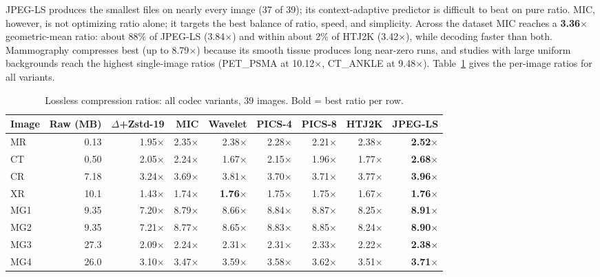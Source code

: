 \documentclass[journal]{IEEEtran}
\begin{document}
JPEG-LS produces the smallest files on nearly every image (37 of 39); its
context-adaptive predictor is difficult to beat on pure ratio. MIC, however, is
not optimizing ratio alone; it targets the best balance of ratio, speed, and
simplicity. Across the dataset MIC reaches a \textbf{3.36}$\times$
geometric-mean ratio: about 88\% of JPEG-LS (3.84$\times$) and within about 2\%
of HTJ2K (3.42$\times$), while decoding faster than both. Mammography compresses
best (up to 8.79$\times$) because its smooth tissue produces long near-zero
runs, and studies with large uniform backgrounds reach the highest single-image
ratios (PET\_PSMA at 10.12$\times$, CT\_ANKLE at 9.48$\times$).
Table~\ref{tab:ratios} gives the per-image ratios for all variants.

\begin{table}[t]
\centering
\caption{Lossless compression ratios: all codec variants, 39 images. Bold =
best ratio per row.}
\label{tab:ratios}
\scriptsize
\begin{tabular}{lrrrrrrrr}
\toprule
Image & Raw (MB) & $\Delta$+Zstd-19 & MIC & Wavelet & PICS-4 & PICS-8 & HTJ2K & JPEG-LS \\
\midrule
MR             & 0.13 & 1.95$\times$ & 2.35$\times$ & 2.38$\times$ & 2.28$\times$ & 2.21$\times$ & 2.38$\times$ & \textbf{2.52$\times$} \\
CT             & 0.50 & 2.05$\times$ & 2.24$\times$ & 1.67$\times$ & 2.15$\times$ & 1.96$\times$ & 1.77$\times$ & \textbf{2.68$\times$} \\
CR             & 7.18 & 3.24$\times$ & 3.69$\times$ & 3.81$\times$ & 3.70$\times$ & 3.71$\times$ & 3.77$\times$ & \textbf{3.96$\times$} \\
XR             & 10.1 & 1.43$\times$ & 1.74$\times$ & \textbf{1.76$\times$} & 1.75$\times$ & 1.75$\times$ & 1.67$\times$ & \textbf{1.76$\times$} \\
MG1            & 9.35 & 7.20$\times$ & 8.79$\times$ & 8.66$\times$ & 8.84$\times$ & 8.87$\times$ & 8.25$\times$ & \textbf{8.91$\times$} \\
MG2            & 9.35 & 7.21$\times$ & 8.77$\times$ & 8.65$\times$ & 8.83$\times$ & 8.85$\times$ & 8.24$\times$ & \textbf{8.90$\times$} \\
MG3            & 27.3 & 2.09$\times$ & 2.24$\times$ & 2.31$\times$ & 2.31$\times$ & 2.33$\times$ & 2.22$\times$ & \textbf{2.38$\times$} \\
MG4            & 26.0 & 3.10$\times$ & 3.47$\times$ & 3.59$\times$ & 3.58$\times$ & 3.62$\times$ & 3.51$\times$ & \textbf{3.71$\times$} \\

\end{tabular}
\end{table}
\end{document}
